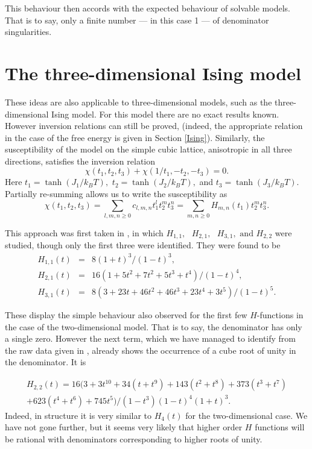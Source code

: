 This behaviour then accords with the expected behaviour of
solvable models. That is to say, only a finite number --- in this
case 1 --- of denominator singularities.

\section{The three-dimensional Ising model}
These ideas are also applicable to three-dimensional models, such
as the three-dimensional Ising model. For this model there are no
exact results known. However inversion relations can still be
proved,  (indeed, the appropriate relation in the case
of the free energy is given in Section \ref{Ising}). 
Similarly, the susceptibility of the model on the simple
cubic lattice, anisotropic in all three directions, satisfies the
inversion relation
\begin{equation}
\chi(t_1,t_2,t_3) + \chi(1/t_1,-t_2,-t_3) = 0.
\end{equation}
Here $t_1 = \tanh(J_1/k_BT),$
$t_2 = \tanh(J_2/k_BT),$ and $t_3 = \tanh(J_3/k_BT).$
 Partially re-summing allows us to write the susceptibility as
\begin{equation}
\chi(t_1,t_2,t_3) = \sum_{l,m,n\ge 0} c_{l,m,n}t_1^lt_2^mt_3^n = \sum_{m,n\ge 0}
 H_{m,n}(t_1)t_2^mt_3^n. 
\end{equation}

 This approach was first taken in \cite{Hans87}, in
 which $H_{1,1}, \mbox{  }H_{2,1}, \mbox{  }H_{3,1}, \mbox{ and }H_{2,2} $ were
studied, though only the first three were identified. 
 They were found to be
 \begin{eqnarray}
 H_{1,1}(t)& =& 8(1 + t)^3/(1 - t)^3, \\
 H_{2,1}(t)& =& 16(1 + 5t^2+ 7t^2 + 5t^3 + t^4)/(1 - t)^4,\\ 
 H_{3,1}(t)& =& 8(3 + 23t + 46t^2 + 46t^3 + 23t^4 + 3t^5)/(1 - t)^5.
 \end{eqnarray}

 These display the simple behaviour also observed for the first few
 $H$-functions
 in the case of the two-dimensional model. That is to say, the denominator
 has only a single zero. However the next term, which we have managed to
 identify from the raw data given in \cite{Hans87}, already
 shows the occurrence of a cube root of unity in the denominator. It is

 \begin{eqnarray}
 H_{2,2}(t) = 16(3 + 3t^{10} + 34(t+t^9) + 143(t^2+t^8) + 373(t^3+t^7) \nonumber \\
 + 623(t^4+t^6) + 745t^5)/(1 - t^3)(1 - t)^4 (1+t)^3. 
 \end{eqnarray}
 Indeed,
 in structure it is very similar to $H_4(t)$ for the two-dimensional case.
 We have not gone further, but it seems very likely that higher order
 $H$ functions will be rational with denominators corresponding to 
 higher roots of unity.
